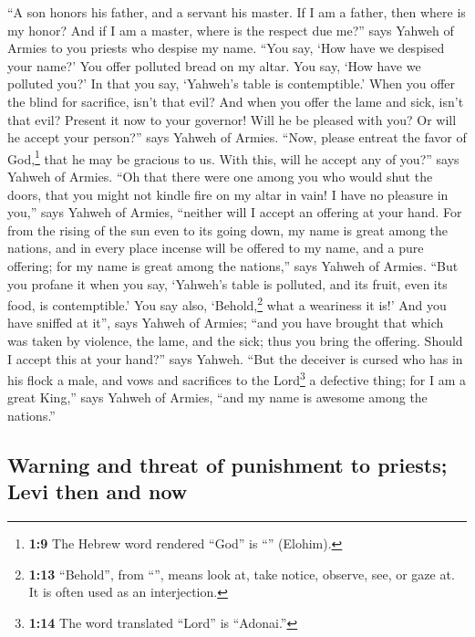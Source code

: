  ``A son honors his father, and a servant his master. If I
am a father, then where is my honor? And if I am a master, where is the
respect due me?'' says Yahweh of Armies to you priests who despise my
name. ``You say, `How have we despised your name?'  You
offer polluted bread on my altar. You say, `How have we polluted you?'
In that you say, `Yahweh's table is contemptible.'  When
you offer the blind for sacrifice, isn't that evil? And when you offer
the lame and sick, isn't that evil? Present it now to your governor!
Will he be pleased with you? Or will he accept your person?'' says
Yahweh of Armies.  ``Now, please entreat the favor of
God,\footnote{\textbf{1:9} The Hebrew word rendered ``God'' is
  ``'' (Elohim).} that he may be gracious to us. With
this, will he accept any of you?'' says Yahweh of Armies.
 ``Oh that there were one among you who would shut the
doors, that you might not kindle fire on my altar in vain! I have no
pleasure in you,'' says Yahweh of Armies, ``neither will I accept an
offering at your hand.  For from the rising of the sun
even to its going down, my name is great among the nations, and in every
place incense will be offered to my name, and a pure offering; for my
name is great among the nations,'' says Yahweh of Armies.
 ``But you profane it when you say, `Yahweh's table is
polluted, and its fruit, even its food, is contemptible.'
 You say also, `Behold,\footnote{\textbf{1:13}
  ``Behold'', from ``'', means look at, take notice,
  observe, see, or gaze at. It is often used as an interjection.} what a
weariness it is!' And you have sniffed at it'', says Yahweh of Armies;
``and you have brought that which was taken by violence, the lame, and
the sick; thus you bring the offering. Should I accept this at your
hand?'' says Yahweh.  ``But the deceiver is cursed who
has in his flock a male, and vows and sacrifices to the Lord\footnote{\textbf{1:14}
  The word translated ``Lord'' is ``Adonai.''} a defective thing; for I
am a great King,'' says Yahweh of Armies, ``and my name is awesome among
the nations.''

\hypertarget{warning-and-threat-of-punishment-to-priests-levi-then-and-now}{%
\subsection{Warning and threat of punishment to priests; Levi then and
now}\label{warning-and-threat-of-punishment-to-priests-levi-then-and-now}}

